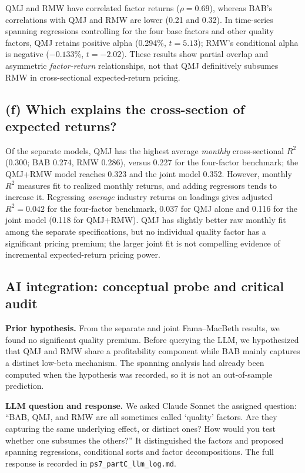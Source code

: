 QMJ and RMW have correlated factor returns ($\rho=0.69$),
whereas BAB's correlations with QMJ and RMW are lower (0.21 and 0.32).
In time-series spanning regressions controlling for the four base factors and
other quality factors, QMJ retains positive alpha (0.294\%, $t=5.13$); RMW's
conditional alpha is negative ($-0.133\%$, $t=-2.02$). These results show
partial overlap and asymmetric \emph{factor-return} relationships, not that
QMJ definitively subsumes RMW in cross-sectional expected-return pricing.

\subsection*{(f) Which explains the cross-section of expected returns?}
Of the separate models, QMJ has the highest average \emph{monthly} cross-sectional
$R^2$ (0.300; BAB 0.274, RMW 0.286), versus 0.227 for the four-factor
benchmark; the QMJ+RMW model reaches 0.323 and the joint model 0.352.
However, monthly $R^2$ measures fit to realized monthly returns, and adding
regressors tends to increase it. Regressing \emph{average} industry returns on
loadings gives adjusted $R^2=0.042$ for the four-factor benchmark, 0.037 for
QMJ alone and 0.116 for the joint model (0.118 for QMJ+RMW). QMJ has slightly
better raw monthly fit among the separate specifications, but no individual
quality factor has a significant pricing premium; the larger joint fit is
not compelling evidence of incremental expected-return pricing power.

\subsection*{AI integration: conceptual probe and critical audit}
\noindent\textbf{Prior hypothesis.} From the separate and joint Fama--MacBeth
results, we found no significant quality premium. Before querying the LLM,
we hypothesized that QMJ and RMW share a profitability component while BAB
mainly captures a distinct low-beta mechanism. The spanning analysis had
already been computed when the hypothesis was recorded, so it is not an
out-of-sample prediction.

\noindent\textbf{LLM question and response.} We asked Claude Sonnet the assigned
question: ``BAB, QMJ, and RMW are all sometimes called `quality' factors. Are
they capturing the same underlying effect, or distinct ones? How would you
test whether one subsumes the others?'' It distinguished the factors and
proposed spanning regressions, conditional sorts and factor decompositions.
The full response is recorded in \texttt{ps7\_partC\_llm\_log.md}.

